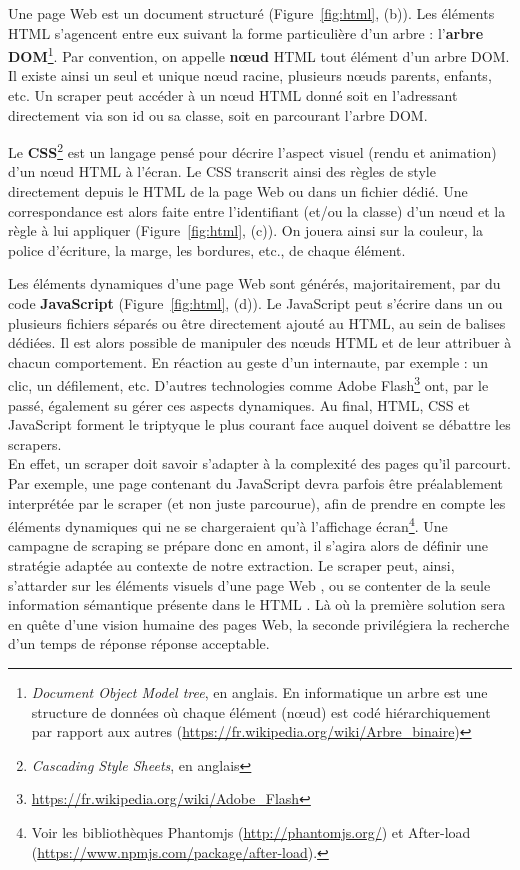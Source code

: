 \documentclass[symmetric,justified,marginals=raggedouter]{tufte-book}
\begin{document}
Une page Web est un document structuré (Figure~\ref{fig:html}, (b)). Les éléments HTML s'agencent entre eux suivant la forme particulière d'un arbre : l'\textbf{arbre DOM}\footnote{\RaggedOuter \textit{Document Object Model tree}, en anglais. En informatique un arbre est une structure de données où chaque élément (nœud) est codé hiérarchiquement par rapport aux autres (\url{https://fr.wikipedia.org/wiki/Arbre_binaire})}. Par convention, on appelle \textbf{nœud} HTML tout élément d'un arbre DOM. Il existe ainsi un seul et unique nœud racine, plusieurs nœuds parents, enfants, etc. Un scraper peut accéder à un nœud HTML donné soit en l'adressant directement via son id ou sa classe, soit en parcourant l'arbre DOM.  

Le \textbf{CSS}\footnote{\RaggedOuter \textit{Cascading Style Sheets}, en anglais} est un langage pensé pour décrire l'aspect visuel (rendu et animation) d'un nœud HTML à l'écran. Le CSS transcrit ainsi des règles de style directement depuis le HTML de la page Web ou dans un fichier dédié. Une correspondance est alors faite entre l'identifiant (et/ou la classe) d'un nœud et la règle à lui appliquer (Figure~\ref{fig:html}, (c)). On jouera ainsi sur la couleur, la police d'écriture, la marge, les bordures, etc., de chaque élément.  

Les éléments dynamiques d'une page Web sont générés, majoritairement, par du code \textbf{JavaScript} (Figure~\ref{fig:html}, (d)). Le JavaScript peut s'écrire dans un ou plusieurs fichiers séparés ou être directement ajouté au HTML, au sein de balises dédiées. Il est alors possible de manipuler des nœuds HTML et de leur attribuer à chacun comportement. En réaction au geste d'un internaute, par exemple : un clic, un défilement, etc. D'autres technologies comme Adobe Flash\footnote{\RaggedOuter \url{https://fr.wikipedia.org/wiki/Adobe_Flash}} ont, par le passé, également su gérer ces aspects dynamiques. Au final, HTML, CSS et JavaScript forment le triptyque le plus courant face auquel doivent se débattre les scrapers.\\

\noindent En effet, un scraper doit savoir s'adapter à la complexité des pages qu'il parcourt. Par exemple, une page contenant du JavaScript devra parfois être préalablement interprétée par le scraper (et non juste parcourue), afin de prendre en compte les éléments dynamiques qui ne se chargeraient qu'à l'affichage écran\footnote{\RaggedOuter Voir les bibliothèques Phantomjs (\url{http://phantomjs.org/}) et After-load (\url{https://www.npmjs.com/package/after-load}).}. Une campagne de scraping se prépare donc en amont, il s'agira alors de définir une stratégie adaptée au contexte de notre extraction. Le scraper peut, ainsi, s'attarder sur les éléments visuels d'une page Web \citep{cai_vips:_2003}, ou se contenter de la seule information sémantique présente dans le HTML \citep{jatowt_detecting_2007}. Là où la première solution sera en quête d'une vision humaine des pages Web, la seconde privilégiera la recherche d'un temps de réponse réponse acceptable. 
\end{document}
